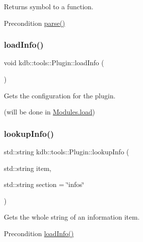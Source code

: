 Returns symbol to a function. 

\begin{DoxyPrecond}{Precondition}
\mbox{\hyperlink{classkdb_1_1tools_1_1Plugin_adfcba2fbdeb436a1083410df804d5fb0}{parse()}} 
\end{DoxyPrecond}
\mbox{\label{classkdb_1_1tools_1_1Plugin_a3a0c6a956d1714002ef9baf8c9d99167}} 
\subsubsection{\texorpdfstring{loadInfo()}{loadInfo()}}
{\footnotesize\ttfamily void kdb\+::tools\+::\+Plugin\+::load\+Info (\begin{DoxyParamCaption}{ }\end{DoxyParamCaption})}



Gets the configuration for the plugin. 

(will be done in \mbox{\hyperlink{classkdb_1_1tools_1_1Modules_ae8d8c91745c9f517e6e8a556f1664f69}{Modules.\+load}}) \mbox{\label{classkdb_1_1tools_1_1Plugin_a5f1dc42adda8340f330eb902812e667d}} 
\subsubsection{\texorpdfstring{lookupInfo()}{lookupInfo()}}
{\footnotesize\ttfamily std\+::string kdb\+::tools\+::\+Plugin\+::lookup\+Info (\begin{DoxyParamCaption}\item[{std\+::string}]{item,  }\item[{std\+::string}]{section = {\ttfamily \char`\"{}infos\char`\"{}} }\end{DoxyParamCaption})}



Gets the whole string of an information item. 

\begin{DoxyPrecond}{Precondition}
\mbox{\hyperlink{classkdb_1_1tools_1_1Plugin_a3a0c6a956d1714002ef9baf8c9d99167}{load\+Info()}} 
\end{DoxyPrecond}
\mbox{\label{classkdb_1_1tools_1_1Plugin_ae4b82f943d0cdb0dd355924aa3201d6f}} 
